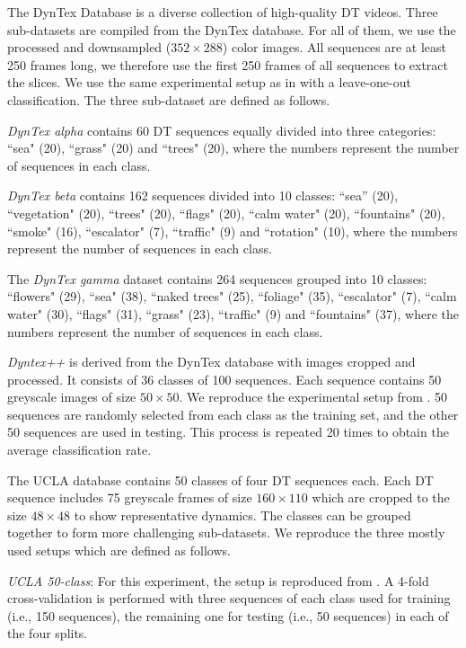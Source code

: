\documentclass[a4paper,11pt]{article}
\begin{document}
The DynTex Database \cite{peteri2010dyntex} is a diverse collection of high-quality DT videos.
Three sub-datasets are compiled from the DynTex database. For all of them, we use the processed and downsampled ($352\times 288$) color images.
All sequences are at least 250 frames long, we therefore use the first 250 frames of all sequences to extract the slices. 
We use the same experimental setup as in \cite{qi2016dynamic} with a leave-one-out classification.
The three sub-dataset are defined as follows.

\textit{DynTex alpha} contains 60 DT sequences equally divided into three categories: ``sea" (20), ``grass" (20) and ``trees" (20), where the numbers represent the number of sequences in each class.

\textit{DynTex beta} contains 162 sequences divided into 10 classes:
``sea'' (20), ``vegetation" (20), ``trees" (20), ``flags" (20), ``calm water" (20), ``fountains" (20), ``smoke" (16), ``escalator" (7), ``traffic" (9) and ``rotation" (10), where the numbers represent the number of sequences in each class.

The \textit{DynTex gamma} dataset \cite{peteri2010dyntex} contains 264 sequences grouped into 10 classes:
``flowers" (29), ``sea" (38), ``naked trees" (25), ``foliage" (35), ``escalator" (7), ``calm water" (30), ``flags" (31), ``grass" (23), ``traffic" (9) and ``fountains" (37), where the numbers represent the number of sequences in each class.


\textit{Dyntex++} \cite{ghanem2010maximum} is derived from the DynTex database with images cropped and processed. It consists of 36 classes of 100 sequences.
Each sequence contains 50 greyscale images of size $50\times 50$. 
We reproduce the experimental setup from \cite{ghanem2010maximum,tiwari2016improved,andrearczyk2015dynamic}.
50 sequences are randomly selected from each class as the training set, and the other 50 sequences are used in testing. This
process is repeated 20 times to obtain the average classification rate.

The UCLA database \cite{doretto2003dynamic} contains 50 classes of four DT sequences each.
Each DT sequence includes 75 greyscale frames of size $160\times 110$ which are cropped to the size $48\times 48$ to show representative dynamics.
The classes can be grouped together to form more challenging sub-datasets. We reproduce the three mostly used setups which are defined as follows.

\textit{UCLA 50-class}: For this experiment, the setup is reproduced from \cite{ghanem2010maximum,xu2011dynamic,tiwari2016improved} .
A 4-fold cross-validation is performed with three sequences of each class used for training (i.e., 150 sequences), the remaining one for testing (i.e., 50 sequences) in each of the four splits.
\end{document}
